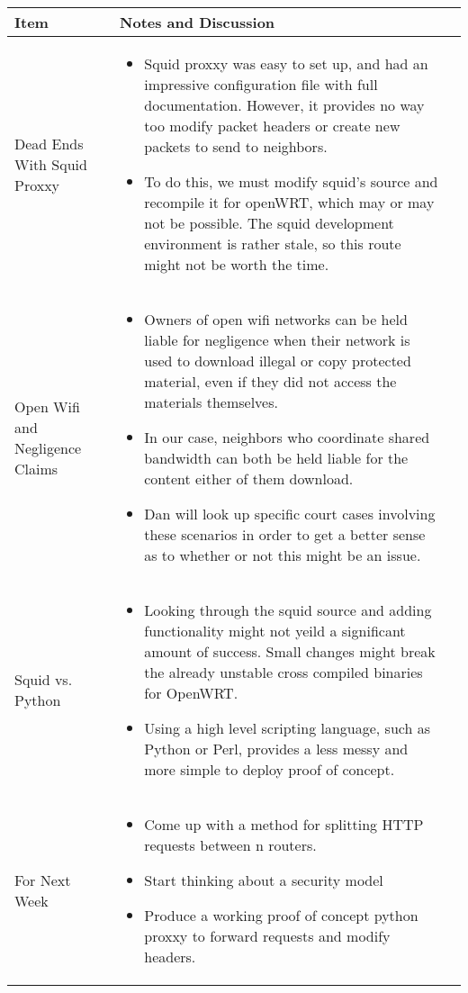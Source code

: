 \documentclass[a4wide,10pt]{extarticle}
\begin{document}
\vspace{0.5cm}
\begin{center}
\begin{tabular}{| m{3.0cm} | m{12.6cm} | m{2cm}|} \hline
\textbf{Item} & \textbf{Notes and Discussion}\\ \hline

Dead Ends With Squid Proxxy & 
	\begin{itemize}
		\item Squid proxxy was easy to set up, and had an impressive configuration file with full documentation. However, it provides no way too modify packet headers or create new packets to send to neighbors. 
		\item To do this, we must modify squid's source and recompile it for openWRT, which may or may not be possible. The squid development environment is rather stale, so this route might not be worth the time.
	\end{itemize} 
\\ \hline
Open Wifi and Negligence Claims &
	\begin{itemize}
		\item Owners of open wifi networks can be held liable for negligence when their network is used to download illegal or copy protected material, even if they did not access the materials themselves.
		\item In our case, neighbors who coordinate shared bandwidth can both be held liable for the content either of them download.
		\item Dan will look up specific court cases involving these scenarios in order to get a better sense as to whether or not this might be an issue.
	\end{itemize}
\\ \hline
Squid vs. Python &
	\begin{itemize}
		\item Looking through the squid source and adding functionality might not yeild a significant amount of success. Small changes might break the already unstable cross compiled binaries for OpenWRT.
		\item Using a high level scripting language, such as Python or Perl, provides a less messy and more simple to deploy proof of concept.
	\end{itemize}
\\ \hline

For Next Week &
	\begin{itemize}
		\item Come up with a method for splitting HTTP requests between n routers.
		\item Start thinking about a security model
		\item Produce a working proof of concept python proxxy to forward requests and
		modify headers.
	\end{itemize}
\\ \hline

\end{tabular}
\end{center}
\end{document}
